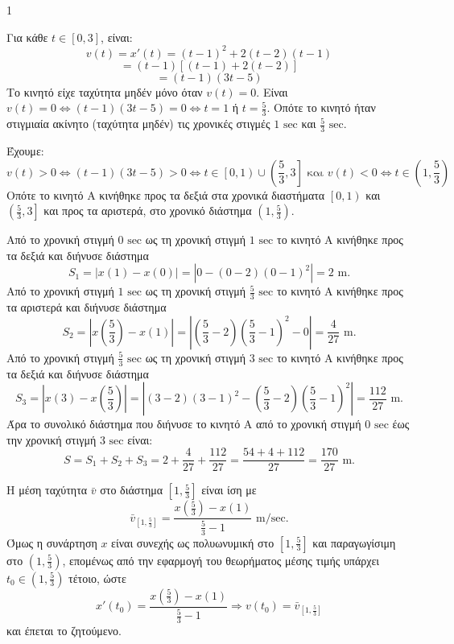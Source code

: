 \begin{ylh}{1}
    \item [Ύλη από εικόνα]
\end{ylh}
\begin{alist}
\item \begin{rlist}
    \item Για κάθε $t \in [0,3]$, είναι:
    \[
    v(t) = x'(t) = (t-1)^2 + 2(t-2)(t-1)
    \]
    \[
    = (t-1)[(t-1)+2(t-2)]
    \]
    \[
    = (t-1)(3t-5)
    \]
    Το κινητό είχε ταχύτητα μηδέν μόνο όταν $v(t)=0$. Είναι $v(t)=0 \Leftrightarrow (t-1)(3t-5)=0 \Leftrightarrow t=1$ ή $t=\frac{5}{3}$. Οπότε το κινητό ήταν στιγμιαία ακίνητο (ταχύτητα μηδέν) τις χρονικές στιγμές $1 \text{ sec}$ και $\frac{5}{3} \text{ sec}$.

    \item Έχουμε:
    \[
    v(t) > 0 \Leftrightarrow (t-1)(3t-5)>0 \Leftrightarrow t \in \left[0,1\right) \cup \left(\frac{5}{3},3\right] \text{ και } v(t)<0 \Leftrightarrow t \in \left(1,\frac{5}{3}\right)
    \]
    Οπότε το κινητό Α κινήθηκε προς τα δεξιά στα χρονικά διαστήματα $\left[0,1\right)$ και $\left(\frac{5}{3},3\right]$ και προς τα αριστερά, στο χρονικό διάστημα $\left(1,\frac{5}{3}\right)$.
\end{rlist}

\item Από το χρονική στιγμή $0 \text{ sec}$ ως τη χρονική στιγμή $1 \text{ sec}$ το κινητό Α κινήθηκε προς τα δεξιά και διήνυσε διάστημα
\[
S_1 = |x(1)-x(0)| = |0-(0-2)(0-1)^2| = 2 \text{ m.}
\]
Από το χρονική στιγμή $1 \text{ sec}$ ως τη χρονική στιγμή $\frac{5}{3} \text{ sec}$ το κινητό Α κινήθηκε προς τα αριστερά και διήνυσε διάστημα
\[
S_2 = \left|x\left(\frac{5}{3}\right)-x(1)\right| = \left|\left(\frac{5}{3}-2\right)\left(\frac{5}{3}-1\right)^2-0\right| = \frac{4}{27} \text{ m.}
\]
Από το χρονική στιγμή $\frac{5}{3} \text{ sec}$ ως τη χρονική στιγμή $3 \text{ sec}$ το κινητό Α κινήθηκε προς τα δεξιά και διήνυσε διάστημα
\[
S_3 = \left|x(3)-x\left(\frac{5}{3}\right)\right| = \left|(3-2)(3-1)^2 - \left(\frac{5}{3}-2\right)\left(\frac{5}{3}-1\right)^2\right| = \frac{112}{27} \text{ m.}
\]
Άρα το συνολικό διάστημα που διήνυσε το κινητό Α από το χρονική στιγμή $0 \text{ sec}$ έως την χρονική στιγμή $3 \text{ sec}$ είναι:
\[
S = S_1 + S_2 + S_3 = 2 + \frac{4}{27} + \frac{112}{27} = \frac{54+4+112}{27} = \frac{170}{27} \text{ m.}
\]

\item Η μέση ταχύτητα $\bar{v}$ στο διάστημα $\left[1,\frac{5}{3}\right]$ είναι ίση με
\[
\bar{v}_{\left[1,\frac{5}{3}\right]} = \frac{x\left(\frac{5}{3}\right)-x(1)}{\frac{5}{3}-1} \text{ m/sec.}
\]
Όμως η συνάρτηση $x$ είναι συνεχής ως πολυωνυμική στο $\left[1,\frac{5}{3}\right]$ και παραγωγίσιμη στο $\left(1,\frac{5}{3}\right)$, επομένως από την εφαρμογή του θεωρήματος μέσης τιμής υπάρχει $t_0 \in \left(1,\frac{5}{3}\right)$ τέτοιο, ώστε
\[
x'(t_0) = \frac{x\left(\frac{5}{3}\right)-x(1)}{\frac{5}{3}-1} \Rightarrow v(t_0) = \bar{v}_{\left[1,\frac{5}{3}\right]}
\]
και έπεται το ζητούμενο.
\end{alist}